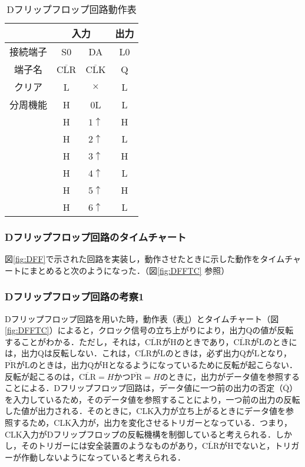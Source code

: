 \begin {table}[ht]
	\begin {center}
		\caption {Dフリップフロップ回路動作表}%
		\begin {tabular}{c|cc|c}\hline
			\multicolumn{1}{c|}{}&%
			\multicolumn{2}{c}{入力}&%
			\multicolumn{1}{|c}{出力}\\ %
			\hline
			接続端子	&	S0				&	DA				&	L0	\\
			端子名	&	$\overline{\mathrm{CLR}}$	&	$\overline{\mathrm{CLK}}$	&	Q	\\ \hline
			クリア	&	L				&	$\times$			&	L	\\ \hline
			分周機能	&	H				&	0L				&	L	\\
					&	H				&	$1\uparrow$		&	H	\\
					&	H				&	$2\uparrow$		&	L	\\
					&	H				&	$3\uparrow$		&	H	\\
					&	H				&	$4\uparrow$		&	L	\\
					&	H				&	$5\uparrow$		&	H	\\
					&	H				&	$6\uparrow$		&	L	\\
		\hline
		\end{tabular}
		\label {tab:DFF_dousahyoutab}%
	\end{center}
\end{table}



%
%
\subsubsection{Dフリップフロップ回路のタイムチャート}
\label{DFF_timechart}
図\ref{fig:DFF}で示された回路を実装し，動作させたときに示した動作をタイムチャートにまとめると次のようになった．（図\ref{fig:DFFTC} 参照）

%
%
\subsubsection{Dフリップフロップ回路の考察1}
\label{DFF_consideration1}
Dフリップフロップ回路を用いた時，動作表（表\ref{tab:DFF_dousahyoutab}）とタイムチャート（図\ref{fig:DFFTC}）によると，クロック信号の立ち上がりにより，出力Qの値が反転することがわかる．ただし，それは，$\overline{\mathrm{CLR}}$がHのときであり，$\overline{\mathrm{CLR}}$がLのときには，出力Qは反転しない．これは，$\overline{\mathrm{CLR}}$がLのときは，必ず出力QがLとなり，$\overline{\mathrm{PR}}$がLのときは，出力QがHとなるようになっているために反転が起こらない．反転が起こるのは，$\overline{\mathrm{CLR}}=H$かつ$\overline{\mathrm{PR}}=H$のときに，出力がデータ値を参照することによる．Dフリップフロップ回路は，データ値に一つ前の出力の否定（$\overline{\mathrm{Q}}$）を入力しているため，そのデータ値を参照することにより，一つ前の出力の反転した値が出力される．そのときに，CLK入力が立ち上がるときにデータ値を参照するため，CLK入力が，出力を変化させるトリガーとなっている．つまり，CLK入力がDフリップフロップの反転機構を制御していると考えられる．しかし，そのトリガーには安全装置のようなものがあり，$\overline{\mathrm{CLR}}$がHでないと，トリガーが作動しないようになっていると考えられる．

